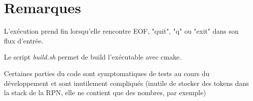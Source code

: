 \documentclass[]{article}
\begin{document}
\section{Remarques}
L'exécution prend fin lorsqu'elle rencontre EOF, "quit", "q" ou "exit" dans son flux d'entrée.

Le script \textit{build.sh} permet de build l'exécutable avec cmake.

Certaines parties du code sont symptomatiques de tests au cours du développement et sont inutilement compliqués (inutile de stocker des tokens dans la stack de la RPN, elle ne contient que des nombres, par exemple)
\end{document}
